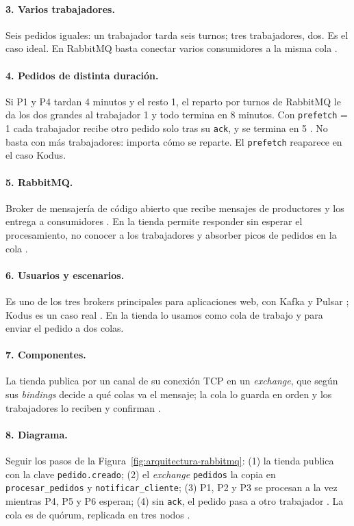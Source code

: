 \paragraph{3. Varios trabajadores.}
Seis pedidos iguales: un trabajador tarda seis turnos; tres trabajadores, dos.
Es el caso ideal. En RabbitMQ basta conectar varios consumidores a la misma
cola \cite{rabbitmq2026amqp}.

\paragraph{4. Pedidos de distinta duración.}
Si P1 y P4 tardan 4 minutos y el resto 1, el reparto por turnos de RabbitMQ
le da los dos grandes al trabajador 1 y todo termina en 8 minutos. Con
\texttt{prefetch} = 1 cada trabajador recibe otro pedido solo tras su
\texttt{ack}, y se termina en 5 \cite{rabbitmq2026workqueues}. No basta con
más trabajadores: importa cómo se reparte. El \texttt{prefetch} reaparece en
el caso Kodus.

\paragraph{5. RabbitMQ.}
Broker de mensajería de código abierto que recibe mensajes de productores y
los entrega a consumidores \cite{rabbitmq2026home,rabbitmq2026amqp}. En la
tienda permite responder sin esperar el procesamiento, no conocer a los
trabajadores y absorber picos de pedidos en la cola \cite{fu2021fair}.

\paragraph{6. Usuarios y escenarios.}
Es uno de los tres brokers principales para aplicaciones web, con Kafka y
Pulsar \cite{dyjach2024brokers}; Kodus es un caso real
\cite{malinosqui2026kodus}. En la tienda lo usamos como cola de trabajo y
para enviar el pedido a dos colas.

\paragraph{7. Componentes.}
La tienda publica por un canal de su conexión TCP en un \textit{exchange}, que
según sus \textit{bindings} decide a qué colas va el mensaje; la cola lo
guarda en orden y los trabajadores lo reciben y confirman
\cite{rabbitmq2026connections,rabbitmq2026channels,rabbitmq2026amqp}.

\paragraph{8. Diagrama.}
Seguir los pasos de la Figura~\ref{fig:arquitectura-rabbitmq}: (1) la tienda
publica con la clave \texttt{pedido.creado}; (2) el \textit{exchange}
\texttt{pedidos} la copia en \texttt{procesar\_pedidos} y
\texttt{notificar\_cliente}; (3) P1, P2 y P3 se procesan a la vez mientras
P4, P5 y P6 esperan; (4) sin \texttt{ack}, el pedido pasa a otro trabajador
\cite{rabbitmq2026queues}. La cola es de quórum, replicada en tres nodos
\cite{rabbitmq2026quorum}.

